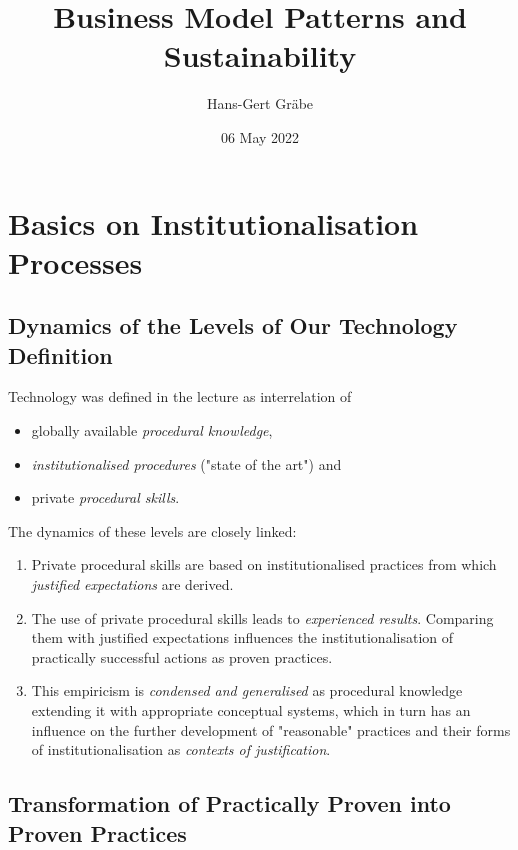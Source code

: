 \documentclass[11pt,a4paper]{article}
\title{Business Model Patterns and Sustainability}
\author{Hans-Gert Gr\"abe}
\date{06 May 2022}
\begin{document}
\maketitle
\tableofcontents
\newpage

\section{Basics on Institutionalisation Processes}

\subsection{Dynamics of the Levels of Our Technology Definition}

Technology was defined in the lecture as interrelation of
\begin{itemize}
\item globally available \emph{procedural knowledge}, 
\item \emph{institutionalised procedures} ("state of the art") and
\item private \emph{procedural skills}.
\end{itemize}

The dynamics of these levels are closely linked:
\begin{enumerate}
\item Private procedural skills are based on institutionalised practices from
  which \emph{justified expectations} are derived.
\item The use of private procedural skills leads to \emph{experienced
  results}. Comparing them with justified expectations influences the
  institutionalisation of practically successful actions as proven practices.
\item This empiricism is \emph{condensed and generalised} as procedural
  knowledge extending it with appropriate conceptual systems, which in turn
  has an influence on the further development of "reasonable" practices and
  their forms of institutionalisation as \emph{contexts of justification}.
\end{enumerate}

\subsection{Transformation of Practically Proven into Proven Practices}
\end{document}
